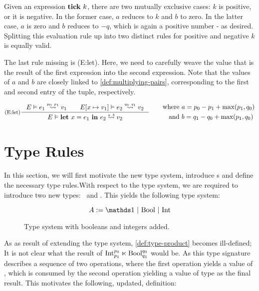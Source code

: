 Given an expression \(\mathbf{tick}~k\), there are two mutually exclusive cases: \(k\) is positive, or it is negative. In the former case, \(a\) reduces to \(k\) and \(b\) to zero. In the latter case, \(a\) is zero and \(b\) reduces to \(-q\), which is again a positive number - as desired. Splitting this evaluation rule up into two distinct rules for positive and negative \(k\) is equally valid.

The last rule missing is (E:let). Here, we need to carefully weave the value that is the result of the first expression into the second expression. Note that the values of \(a\) and \(b\) are closely linked to \cref{def:multiplying-pairs}, corresponding to the first and second entry of the tuple, respectively.

\[
   \inference[(E:let)]
   {\evals{E}{e_1}{v_1}{p_0}{p_1} \qquad \evals{\envaugment{E}{x}{v_1}}{e_2}{v_2}{q_0}{q_1}}
   {\evals{E}{\letexp{x}{e_1}{e_2}}{v_2}{a}{b}}%
   \qquad
   \begin{aligned}
      \text{where }  &a = p_0 - p_1 + \max(p_1, q_0)\\
      \text{and }    &b = q_1 - q_0 + \max(p_1, q_0) 
   \end{aligned}
\]

\section{Type Rules}\label{sec:type-rules-5}

In this section, we will first motivate the new type system, introduce s and define the necessary type rules.With respect to the type system, we are required to introduce two new types: \bool~and \typeint. This yields the following type system:

\begin{figure}[H]
   \[A := \unit~|~\text{\bool}~|~\text{\typeint}\]
   \caption{Type system with booleans and integers added.}
   \label{fig:type-system-5}
\end{figure}

As as result of extending the type system, \cref{def:type-product} becomes ill-defined; It is not clear what the result of \(\mbox{Int} ^{p_0}_{p_1} \ltimes \textrm{Bool} ^{q_0}_{q_1}\) would be. As this type signature describes a sequence of two operations, where the first operation yields a value of \typeint, which is consumed by the second operation yielding a value of type \bool as the final result. This motivates the following, updated, definition:

